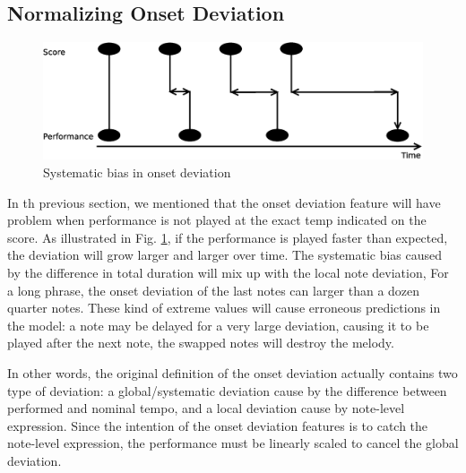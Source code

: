    \subsection{Normalizing Onset Deviation}
   \label{sec:normalize}
\begin{figure}[tp]
   \begin{center}
      \includegraphics[width=\textwidth]{fig/prob_onset_diff}

   \end{center}
   \caption{Systematic bias in onset deviation }
   \label{fig:normalizationprob}
\end{figure}
%
In th previous section, we mentioned that the onset deviation feature will have problem when performance is not played at the exact temp indicated on the score. As illustrated in Fig. \ref{fig:normalizationprob}, if the performance is played faster than expected, the deviation will grow larger and larger over time. The systematic bias caused by the difference in total duration will mix up with the local note deviation, For a long phrase, the onset deviation of the last notes can larger than a dozen quarter notes. These kind of extreme values will cause erroneous predictions in the model: a note may be delayed for a very large deviation, causing it to be played after the next note, the swapped notes will destroy the melody.
 
In other words, the original definition of the onset deviation actually contains two type of deviation: a global/systematic deviation cause by the difference between performed and nominal tempo, and a local deviation cause by note-level expression. Since the intention of the onset deviation features is to catch the note-level expression, the performance must be linearly scaled to cancel the global deviation.

